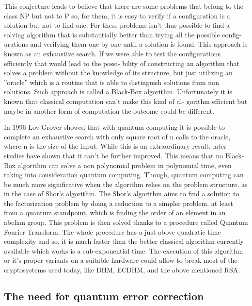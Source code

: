 \documentclass{article}
\begin{document}
\vspace{10pt}

This conjecture leads to believe that there are some problems that belong to
the class NP but not to P so, for them, it is easy to verify if a configuration is
a solution but not to find one. For these problems isn’t thus possible to find a
solving algorithm that is substantially better than trying all the possible config-
urations and verifying them one by one until a solution is found. This approach
is known as an exhaustive search.
If we were able to test the configurations efficiently that would lead to the possi-
bility of constructing an algorithm that solves a problem without the knowledge
of its structure, but just utilizing an ”oracle” which is a routine that is able to
distinguish solutions from non solutions.
Such approach is called a Black-Box algorithm.
Unfortunately it is known that classical computation can’t make this kind of al-
gorithm efficient but maybe in another form of computation the outcome could
be different.

\newpage

In 1996 Lov Grover showed that with quantum computing it is possible to
complete an exhaustive search with only square root of n calls to the oracle,
where n is the size of the input. While this is an extraordinary result, later
studies have shown that it can’t be further improved.
This means that no Black-Box algorithm can solve a non polynomial problem
in polynomial time, even taking into consideration quantum computing.
Though, quantum computing can be much more significative when the algorithm
relies on the problem structure, as in the case of Shor’s algorithm.
The Shor’s algorithm aims to find a solution to the factorization problem by
doing a reduction to a simpler problem, at least from a quantum standpoint,
which is finding the order of an element in an abelian group. This problem is
then solved thanks to a procedure called Quantum Fourier Transform.
The whole procedure has a just above quadratic time complexity and so, it is
much faster than the better classical algorithm currently available which works
is a sub-exponential time.
The execution of this algorithm or it’s proper variants on a suitable hardware
could allow to break most of the cryptosystems used today, like DHM, ECDHM,
and the above mentioned RSA.

\vspace{20pt}


\subsection{The need for quantum error correction}
\end{document}

